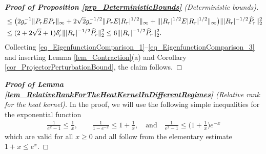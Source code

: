 \documentclass[a4paper,11pt]{article} %
\numberwithin{equation}{section}
\theoremstyle{definition}
\theoremstyle{remark}
\theoremstyle{plain}
\begin{document}
\begin{proof}[\normalfont \textbf{Proof of Proposition \ref{prp_DeterministicBounds}} (Deterministic bounds)]
\begin{align}
      & \le 
      \big( 2 g_r^{-1} \| P_r E P_r \|_{\infty} + 2 \sqrt{2} g_r^{-1/2} \| P_r E |R_r|^{1/2} \|_{\infty}
                                                + \| |R_r|^{1/2} E |R_r|^{1/2} \|_{\infty} 
      \big)
      \||R_r|^{-1/2}\widehat P_r\|_2^2
      \notag 
      \\
      & \le 
      (2 + 2 \sqrt{2} + 1) \delta_r^\prime \| |R_r|^{-1/2} \widehat P_r \|_2^2 
      \le 
      6 \| |R_r|^{-1/2} \widehat P_r \|_2^2.
      \notag
    \end{align}
    Collecting \eqref{eq_EigenfunctionComparison_1}--\eqref{eq_EigenfunctionComparison_3} and inserting Lemma \ref{lem_Contraction}(a) and Corollary \ref{cor_ProjectorPerturbationBound}, the claim follows.
\end{proof}%

\begin{proof}[\normalfont \textbf{Proof of Lemma \ref{lem_RelativeRankForTheHeatKernelInDifferentRegimes}} (Relative rank for the heat kernel)]%
  \label{prf_RelativeRankForTheHeatKernelInDifferentRegimes}
  In the proof, we will use the following simple inequalities for the exponential function
  \begin{align}
    \label{eq_ElementaryExponentialInequalities}
    \frac{1}{e^x-1}      \le \frac{1}{x},
    \qquad 
    \frac{1}{1 - e^{-x}} \le  1 + \frac{1}{x},
    \quad \text{and} \quad 
    \frac{1}{e^x - 1}    \le \Big( 1 + \frac{1}{x} \Big) e^{-x}
  \end{align}
  which are valid for all $x \ge 0$ and all follow from the elementary estimate \( 1 + x \le e^{x} \).


\end{proof}
\end{document}
